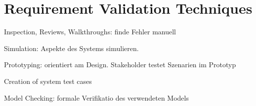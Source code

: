\section{Requirement Validation Techniques}
\begin{compactitem}
    \item Inspection, Reviews, Walkthroughs: finde Fehler manuell
    \item Simulation: Aspekte des Systems simulieren.
    \item Prototyping: orientiert am Design. Stakeholder testet Szenarien im
    Prototyp
    \item Creation of system test cases
    \item Model Checking: formale Verifikatio des verwendeten Models
\end{compactitem}
